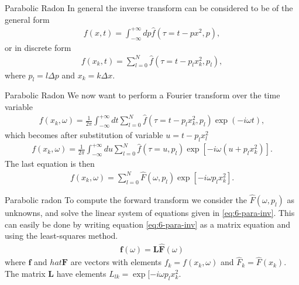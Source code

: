 \documentclass[xcolor=dvipsnames,notes]{beamer}
\begin{document}
\begin{frame}{Parabolic Radon}
In general the inverse
transform can be considered to be of the general form
%
\begin{eqnarray}
  f(x,t) = \int^{+\infty}_{-\infty} dp \hat{f}(\tau=t-px^2,p),
                   \label{eq:6-para}
\end{eqnarray}
%
or in discrete form
%
\begin{eqnarray}
  f(x_k,t) = \sum_{l=0}^N \hat{f}(\tau=t- p_l x^2_k,p_l),
                   \label{eq:6-para-disc}
\end{eqnarray}
%
where $p_l=l\Delta p$ and $x_k = k\Delta x$. 
\end{frame}
%
\begin{frame}{Parabolic Radon}
We now want to perform a Fourier transform over the time variable
%
\begin{eqnarray}
  f(x_k,\omega) = \frac{1}{2\pi}\int^{+\infty}_{-\infty}dt \sum_{l=0}^N \hat{f}(\tau=t- p_l x^2_k,p_l)\exp(-i\omega t),
\end{eqnarray}
which becomes after substitution of variable $u=t-p_l x^2_l$
%
%
\begin{eqnarray}
  f(x_k,\omega) = \frac{1}{2\pi}\int^{+\infty}_{-\infty}du \sum_{l=0}^N \hat{f}(\tau=u,p_l)\exp[-i\omega (u+p_l x_k^2)].
\end{eqnarray}
%
The last equation is then
%
\begin{eqnarray}
  f(x_k,\omega) = \sum_{l=0}^N \hat{F}(\omega, p_l)\exp[-i\omega p_l x^2_k].
                   \label{eq:6-para-inv}
\end{eqnarray}
%
\end{frame}
\begin{frame}{Parabolic radon}
To compute the forward transform
we consider the $\hat{F}(\omega,p_l)$ as unknowns, and solve the linear system of
equations given in \eqref{eq:6-para-inv}. 
This can easily be done by writing equation \eqref{eq:6-para-inv} as a matrix equation
and using the least-squares method.
%
\begin{eqnarray}
  \mathbf{f}(\omega) = \mathbf{L}\hat{\mathbf{F}}(\omega)
                   \label{eq:6-para-inv2}
\end{eqnarray}
%
where $\mathbf{f}$ and $hat{\mathbf{F}}$ are vectors with elements $f_k=f(x_k,\omega)$ 
and $\hat{F}_k=\hat{F}(x_k)$. 
The matrix $\mathbf{L}$ have elements $L_{lk}=\exp[-i\omega p_l x^2_k$.
\end{frame}
\end{document}
